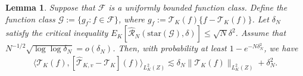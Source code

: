 \documentclass[11pt]{article}
\theoremstyle{plain}
\newtheorem{lemma}{Lemma}
\theoremstyle{definition}
\theoremstyle{remark}
\theoremstyle{definition}
\begin{document}
\begin{lemma}
\label{lemma::localmax2}
    Suppose that $\mathcal{F}$ is a uniformly bounded function class. Define the function class $\mathcal{G} := \{g_f: f \in \mathcal{F} \}$, where $g_f:= \mathcal{T}_{K}(f)\{f -  \mathcal{T}_{K}(f)\}$.  Let $\delta_N$ satisfy the critical inequality $E_K[\widehat{\mathcal{R}}_N(\text{star}(\mathcal{G}), \delta)]\leq \sqrt{N} \delta^2$. Assume that $ N^{-1/2} \sqrt{\log \log \delta_{N}} =  o(\delta_{N})$.  Then,  with probability at least $1 - e^{-N\delta_N^2}$, we have
\begin{align*}
   \langle  \mathcal{T}_{K}(f), [\widehat{\mathcal{T}}_{K,v} -  \mathcal{T}_{K}](f) \rangle_{L^2_K(Z)}   \lesssim \delta_N   \|\mathcal{T}_{K}(f)\|_{L^2_K(Z)} + \delta_N^2 .
\end{align*} 

\end{lemma}
\end{document}
